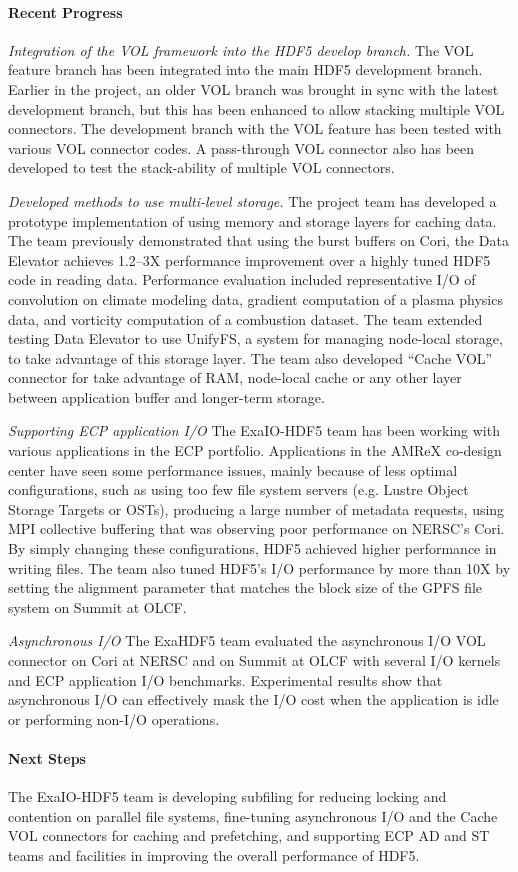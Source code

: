 \paragraph{Recent Progress}
\emph{Integration of the VOL framework into the HDF5 develop branch. } The VOL feature branch has been integrated into the main HDF5 development branch. Earlier in the project, an older VOL branch was brought in sync with the latest development branch, but this has been enhanced to allow stacking multiple VOL connectors. The development branch with the VOL feature has been tested with various VOL connector codes. A pass-through VOL connector also has been developed to test the stack-ability of multiple VOL connectors. 

\emph{Developed methods to use multi-level storage.} The project team has developed a prototype implementation of using memory and storage layers for caching data. The team previously demonstrated that using the burst buffers on Cori, the Data Elevator achieves 1.2--3X performance improvement over a highly tuned HDF5 code in reading data. Performance evaluation included representative I/O of convolution on climate modeling data, gradient computation of a plasma physics data, and vorticity computation of a combustion dataset. The team extended testing Data Elevator to use UnifyFS, a system for managing node-local storage, to take advantage of this storage layer. The team also developed ``Cache VOL'' connector for take advantage of RAM, node-local cache or any other layer between application buffer and longer-term storage.  

\emph{Supporting ECP application I/O}
The ExaIO-HDF5 team has been working with various applications in the ECP portfolio. Applications in the AMReX co-design center have seen some performance issues, mainly because of less optimal configurations, such as using too few file system servers (e.g. Lustre Object Storage Targets or OSTs), producing a large number of metadata requests, using MPI collective buffering that was observing poor performance on NERSC's Cori. By simply changing these configurations, HDF5 achieved higher performance in writing files. The team also tuned HDF5's I/O performance by more than 10X by setting the alignment parameter that matches the block size of the GPFS file system on Summit at OLCF. 

\emph{Asynchronous I/O}
The ExaHDF5 team evaluated the asynchronous I/O VOL connector on Cori at NERSC and on Summit at OLCF with several I/O kernels and ECP application I/O benchmarks. Experimental results show that asynchronous I/O can effectively mask the I/O cost when the application is idle or performing non-I/O operations. 

\paragraph{Next Steps}

The ExaIO-HDF5 team is developing subfiling for reducing locking and contention on parallel file systems,  fine-tuning asynchronous I/O and the Cache VOL connectors for caching and prefetching, and supporting ECP AD and ST teams and facilities in improving the overall performance of HDF5.

